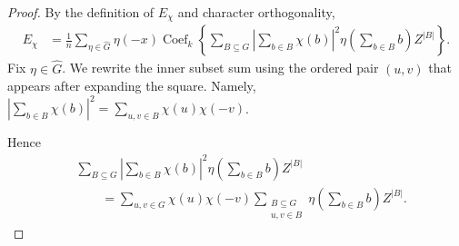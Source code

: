 \documentclass[11pt]{article}
\theoremstyle{definition}
\begin{document}
\begin{proof}
	By the definition of \(E_\chi\) and character orthogonality,
	\[
	\begin{aligned}
	E_\chi
	&=
	\frac1n
	\sum_{\eta\in\widehat G}
	\eta(-x)
	\operatorname{Coef}_{k}\left\{
	\sum_{B\subseteq G}
	\left|\sum_{b\in B}\chi(b)\right|^2
	\eta\left(\sum_{b\in B}b\right)
	Z^{|B|}\right\}.
	\end{aligned}
	\]
Fix \(\eta\in\widehat G\). We rewrite the inner subset sum using the ordered pair \((u,v)\) that appears after expanding the square. Namely,
$\left|\sum_{b\in B}\chi(b)\right|^2=\sum_{u,v\in B}\chi(u)\chi(-v)$.

Hence
\begin{equation}\label{eq:pair-counting-view}
	\begin{aligned}
		&\sum_{B\subseteq G}
		\left|\sum_{b\in B}\chi(b)\right|^2
		\eta\left(\sum_{b\in B}b\right)Z^{|B|} \\
		&\qquad =
		\sum_{u,v\in G}\chi(u)\chi(-v)
		\sum_{\substack{B\subseteq G\\ u,v\in B}}
		\eta\left(\sum_{b\in B}b\right)Z^{|B|}.
	\end{aligned}
\end{equation}



\end{proof}
\end{document}

